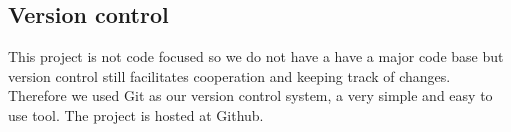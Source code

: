 \subsection{Version control }
This project is not code focused so we do not have a have a major code base but version control still facilitates cooperation and keeping track of changes. Therefore we used Git as our version control system, a very simple and easy to use tool. The project is hosted at Github.